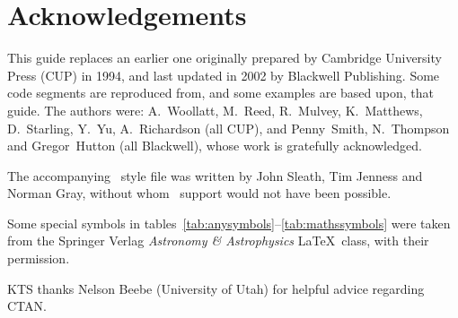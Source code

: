 
\section*{Acknowledgements}

This guide replaces an earlier one originally prepared by Cambridge University Press (CUP) in 1994, and last updated in 2002 by Blackwell Publishing.
Some code segments are reproduced from, and some examples are based upon, that guide.
The authors were: A.~Woollatt, M.~Reed, R.~Mulvey, K.~Matthews, D.~Starling, Y.~Yu, A.~Richardson (all CUP), and Penny~Smith, N.~Thompson and Gregor~Hutton (all Blackwell), whose work is gratefully acknowledged.

The accompanying \bibtex\ style file was written by John Sleath, Tim Jenness and Norman Gray, without whom \bibtex\ support would not have been possible.

Some special symbols in tables~\ref{tab:anysymbols}--\ref{tab:mathssymbols} were taken from the Springer Verlag \textit{Astronomy \& Astrophysics} \LaTeX\ class, with their permission.

KTS thanks Nelson Beebe (University of Utah) for helpful advice regarding CTAN.
